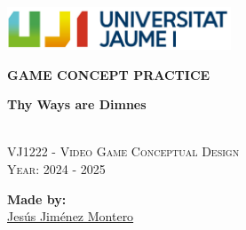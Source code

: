 \documentclass[12pt]{article}
\begin{document}
\begin{titlepage}
    \centering
    \vspace*{5cm}

    \includegraphics[width=0.5\textwidth]{Imagenes/marca-uji-color.jpg}\par\vspace{1cm}

    {\Huge \bfseries GAME CONCEPT PRACTICE \par}
    {\large \bfseries Thy Ways are Dimnes \par}

    \textsc{\large }
    \vspace{0.5cm} \\
    \textsc{\Large VJ1222 - Video Game Conceptual Design}
    \vspace{0.5cm} \\
    \textsc{\large Year: 2024 - 2025}
    \vfill

    \textbf{Made by:}         \\
    \href{https://www.richardotomislav.com/}{Jesús Jiménez Montero }      \\

    \vspace{1cm}

    \vfill
\end{titlepage}


\renewcommand{\contentsname}{Table of Contents}
\tableofcontents
\newpage

\end{document}
